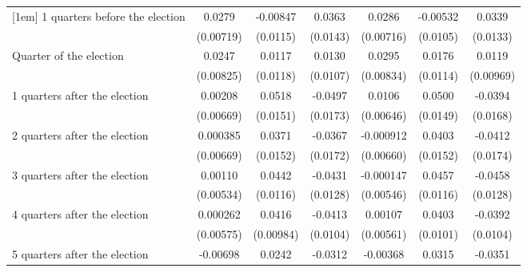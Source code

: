 \begin{table}[!ht]
\begin{tabular}{l*{6}{c}}
[1em]
 1 quarters before the election&      0.0279\sym{***}&    -0.00847         &      0.0363\sym{*}  &      0.0286\sym{***}&    -0.00532         &      0.0339\sym{*}  \\
                    &   (0.00719)         &    (0.0115)         &    (0.0143)         &   (0.00716)         &    (0.0105)         &    (0.0133)         \\
[1em]
Quarter of the election&      0.0247\sym{**} &      0.0117         &      0.0130         &      0.0295\sym{***}&      0.0176         &      0.0119         \\
                    &   (0.00825)         &    (0.0118)         &    (0.0107)         &   (0.00834)         &    (0.0114)         &   (0.00969)         \\
[1em]
 1 quarters after the election&     0.00208         &      0.0518\sym{***}&     -0.0497\sym{**} &      0.0106         &      0.0500\sym{***}&     -0.0394\sym{*}  \\
                    &   (0.00669)         &    (0.0151)         &    (0.0173)         &   (0.00646)         &    (0.0149)         &    (0.0168)         \\
[1em]
 2 quarters after the election&    0.000385         &      0.0371\sym{*}  &     -0.0367\sym{*}  &   -0.000912         &      0.0403\sym{**} &     -0.0412\sym{*}  \\
                    &   (0.00669)         &    (0.0152)         &    (0.0172)         &   (0.00660)         &    (0.0152)         &    (0.0174)         \\
[1em]
 3 quarters after the election&     0.00110         &      0.0442\sym{***}&     -0.0431\sym{***}&   -0.000147         &      0.0457\sym{***}&     -0.0458\sym{***}\\
                    &   (0.00534)         &    (0.0116)         &    (0.0128)         &   (0.00546)         &    (0.0116)         &    (0.0128)         \\
[1em]
 4 quarters after the election&    0.000262         &      0.0416\sym{***}&     -0.0413\sym{***}&     0.00107         &      0.0403\sym{***}&     -0.0392\sym{***}\\
                    &   (0.00575)         &   (0.00984)         &    (0.0104)         &   (0.00561)         &    (0.0101)         &    (0.0104)         \\
[1em]
 5 quarters after the election&    -0.00698         &      0.0242\sym{*}  &     -0.0312\sym{**} &    -0.00368         &      0.0315\sym{**} &     -0.0351\sym{**} \\

\end{tabular}
\end{table}
